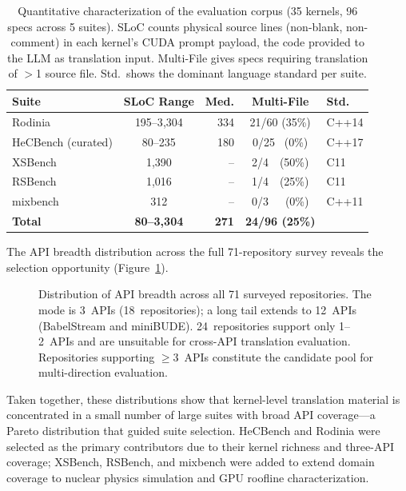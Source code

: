 \begin{table}[!htbp]
\centering
\caption{Quantitative characterization of the evaluation corpus (35 kernels, 96 specs across 5 suites). SLoC counts physical source lines (non-blank, non-comment) in each kernel's CUDA prompt payload, the code provided to the LLM as translation input. Multi-File gives specs requiring translation of $>$1 source file. Std.\ shows the dominant language standard per suite.}
\label{tab:benchmark-characterization}
\small
\begin{tabular}{@{}lcrcl@{}}
\toprule
Suite & SLoC Range & Med. & Multi-File & Std. \\
\midrule
Rodinia            & 195--3{,}304       & 334 & 21/60 (35\%) & C++14 \\
HeCBench (curated) &    80--235         & 180 &  0/25 ~(0\%) & C++17 \\
XSBench            &    1{,}390         &  -- &  2/4~~(50\%) & C11   \\
RSBench            &    1{,}016         &  -- &  1/4~~(25\%) & C11   \\
mixbench           &       312          &  -- &  0/3~~~(0\%) & C++11 \\
\midrule
\textbf{Total} & \textbf{80--3{,}304} & \textbf{271} & \textbf{24/96 (25\%)} & \\
\bottomrule
\end{tabular}
\end{table}

The API breadth distribution across the full 71-repository survey reveals the selection opportunity (Figure~\ref{fig:api-count-hist}).

\begin{figure}[htbp]
    \centering
    
    \caption{Distribution of API breadth across all 71 surveyed repositories. The mode is 3~APIs (18~repositories); a long tail extends to 12~APIs (BabelStream and miniBUDE). 24~repositories support only 1--2~APIs and are unsuitable for cross-API translation evaluation. Repositories supporting $\geq$3~APIs constitute the candidate pool for multi-direction evaluation.}
    \label{fig:api-count-hist}
\end{figure}

Taken together, these distributions show that kernel-level translation material is concentrated in a small number of large suites with broad API coverage---a Pareto distribution that guided suite selection. HeCBench and Rodinia were selected as the primary contributors due to their kernel richness and three-API coverage; XSBench, RSBench, and mixbench were added to extend domain coverage to nuclear physics simulation and GPU roofline characterization.

